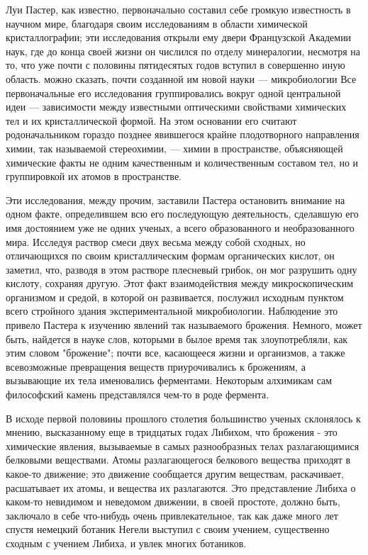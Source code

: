 Луи  Пастер,   как  известно,  первоначально  составил   себе  громкую
известность в  научном мире,  благодаря своим исследованиям  в области
химической  кристаллографии;   эти  исследования  открыли   ему  двери
Французской  Академии  наук, где  до  конца  своей жизни  он  числился
по  отделу минералогии,  несмотря  на  то, что  уже  почти с  половины
пятидесятых годов  вступил в  совершенно иную область.  можно сказать,
почти созданной  им новой  науки --- микробиологии  Все первоначальные
его  исследования группировались  вокруг  одной  центральной идеи  ---
зависимости   между  известными   оптическими  свойствами   химических
тел  и  их  кристаллической  формой. На  этом  основании  его  считают
родоначальником  гораздо   позднее  явившегося   крайне  плодотворного
направления   химии,  так   называемой   стереохимии,   ---  химии   в
пространстве,  объясняющей  химические  факты  не  одним  качественным
и  количественным  составом  тел,  но   и  группировкой  их  атомов  в
пространстве.

Эти исследования, между прочим,  заставили Пастера остановить внимание
на  одном  факте,  определившем   всю  его  последующую  деятельность,
сделавшую  его   имя  достоянием   уже  не   одних  ученых,   а  всего
образованного  и необразованного  мира.  Исследуя  раствор смеси  двух
весьма между  собой сходных, но отличающихся  по своим кристаллическим
формам органических кислот,  он заметил, что, разводя  в этом растворе
плесневый грибок, он мог разрушить одну кислоту, сохраняя другую. Этот
факт  взаимодействия между  микроскопическим  организмом  и средой,  в
которой  он развивается,  послужил  исходным  пунктом всего  стройного
здания экспериментальной микробиологии. Наблюдение это привело Пастера
к  изучению явлений  так  называемого брожения.  Немного, может  быть,
найдется в науке слов, которыми  в былое время так злоупотребляли, как
этим словом  "брожение"; почти все,  касающееся жизни и  организмов, а
также всевозможные  превращения веществ приурочивались к  брожениям, а
вызывающие  их тела  именовались ферментами.  Некоторым алхимикам  сам
философский камень представлялся чем-то в роде фермента.

В  исходе   первой  половины  прошлого  столетия   большинство  ученых
склонялось к мнению,  высказанному еще в тридцатых  годах Либихом, что
брожения -  это химические  явления, вызываемые в  самых разнообразных
телах  разлагающимися   белковыми  веществами.   Атомы  разлагающегося
белкового  вещества   приходят  в  какое-то  движение;   это  движение
сообщается  другим веществам,  раскачивает,  расшатывает  их атомы,  и
вещества их разлагаются. Это представление Либиха о каком-то невидимом
и неведомом движении, в своей  простоте, должно быть, заключало в себе
что-нибудь  очень  привлекательное,  так  как даже  много  лет  спустя
немецкий ботаник Негели выступил  с своим учением, существенно сходным
с учением Либиха, и увлек многих ботаников.


